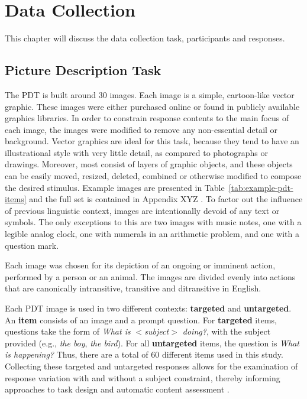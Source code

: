 \chapter{Data Collection}

This chapter will discuss the data collection task, participants and responses.

\section{Picture Description Task}
\label{sec:pdt}


The PDT is built around 30 images. Each image is a simple, cartoon-like vector graphic. These images were either purchased online or found in publicly available graphics libraries. In order to constrain response contents to the main focus of each image, the images were modified to remove any non-essential detail or background. Vector graphics are ideal for this task, because they tend to have an illustrational style with very little detail, as compared to photographs or drawings. Moreover, most consist of layers of graphic objects, and these objects can be easily moved, resized, deleted, combined or otherwise modified to compose the desired stimulus. Example images are presented in Table~\ref{tab:example-pdt-items} and the full set is contained in Appendix XYZ . To factor out the influence of previous linguistic context, images are intentionally devoid of any text or symbols. The only exceptions to this are two images with music notes, one with a legible analog clock, one with numerals in an arithmetic problem, and one with a question mark.

Each image was chosen for its depiction of an ongoing or imminent action, performed by a person or an animal. The images are divided evenly into actions that are canonically intransitive, transitive and ditransitive in English.

Each PDT image is used in two different contexts: \textbf{targeted} and \textbf{untargeted}. An \textbf{item} consists of an image and a prompt question. For \textbf{targeted} items, questions take the form of \textit{What is $<$subject$>$ doing?}, with the subject provided (e.g., \textit{the boy}, \textit{the bird}). For all \textbf{untargeted} items, the question is \textit{What is happening?} Thus, there are a total of 60 different items used in this study. Collecting these targeted and untargeted responses allows for the examination of response variation with and without a subject constraint, thereby informing approaches to task design and automatic content assessment \citep{foster2009native, cho2013investigating}. 

